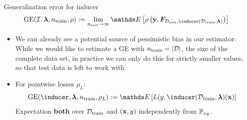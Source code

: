 \begin{vbframe}{Generalization error for inducer}
  $$\GEfull := 
  \lim_{\ntest \rightarrow \infty} \E \left[ \rho \left(
  \yv, \F_{\Dtest, \inducer(\D_{\mathrm{train}}, \lamv)} 
  \right)\right]$$
\begin{itemize}
  \item We can already see a potential source of pessimistic bias in our
      estimator: While we would like to estimate a GE with 
      $n_{\mathrm{train}} = |\mathcal{D}|$, the size of the complete data set, 
      in practice we can only do this for strictly smaller values, so that test data is left to work with.
  \item For pointwise losses $\rho_L$:
      $$\GE(\inducer, \lamv, n_\mathrm{train}, \rho_L) := 
      \E \left[ L(y, \inducer(\D_{\mathrm{train}}, \lamv)(\xv) \right]$$
  Expectation \textbf{both} over $\mathcal{D}_{\text{train}}$ and $(\mathbf{x},y)$ independently from $\mathbb{P}_{xy}$.


\end{itemize}



\end{vbframe}







\endlecture

